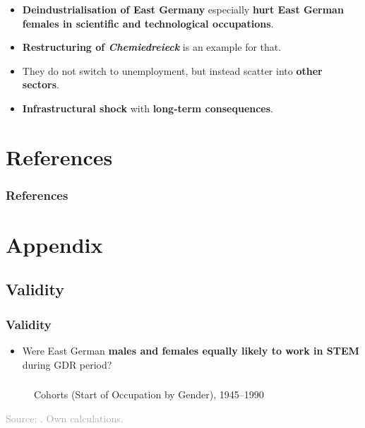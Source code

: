 \documentclass[11pt, aspectratio=1610, xcolor={dvipsnames}]{beamer}
\newcommand{\highlight}[1]{\textbf{\textcolor{PineGreen}{#1}}}
\begin{document}
	\begin{frame}
		\frametitle{}
		
		\begin{itemize}
			\item \highlight{Deindustrialisation of East Germany} especially \highlight{hurt East German females in scientific and technological occupations}.
			\item \highlight{Restructuring of \emph{Chemiedreieck}} is an example for that.
			\item They do not switch to unemployment, but instead scatter into \highlight{other sectors}.
			\item \highlight{Infrastructural shock} with \highlight{long-term consequences}.
		\end{itemize}
		
	\end{frame}
	
	\section*{References}
	\begin{frame}[allowframebreaks]
		\frametitle{References}
		
		{\scriptsize
		
		}
		
	\end{frame}
	
	\appendix
	
	\section{Appendix}
	
	\subsection{Validity}
	\begin{frame}
		\frametitle{Validity}
		
		\begin{itemize}
			\item Were East German \highlight{males and females equally likely to work in STEM} during GDR period?
		\end{itemize}
		
	\end{frame}
	
	\begin{frame}
		\frametitle{}
		
		\begin{figure}[h]
			\centering
			\caption{Cohorts (Start of Occupation by Gender), 1945--1990}
			\label{fig:validity}
			\resizebox{75mm}{!}{}
		\end{figure}
		
		{\scriptsize
			\textcolor{darkgray}{Source: \cite{Mayer1995}. Own calculations.}
		}
		
	\end{frame}
	
\end{document}
